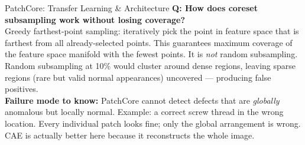 \documentclass[aspectratio=169,10pt]{beamer}
\begin{document}
\begin{frame}{PatchCore: Transfer Learning \& Architecture}
{  \textbf{Q: How does coreset subsampling work without losing coverage?}\\[0.5pt]
  Greedy farthest-point sampling: iteratively pick the point in feature space that is
  farthest from all already-selected points. This guarantees maximum coverage of the
  feature space manifold with the fewest points. It is \emph{not} random subsampling.
  Random subsampling at 10\% would cluster around dense regions, leaving sparse regions
  (rare but valid normal appearances) uncovered — producing false positives.\\[1.5pt]

  \textbf{Failure mode to know:} PatchCore cannot detect defects that are \emph{globally}
  anomalous but locally normal. Example: a correct screw thread in the wrong location.
  Every individual patch looks fine; only the global arrangement is wrong.
  CAE is actually better here because it reconstructs the whole image.
}
\end{frame}
\end{document}
